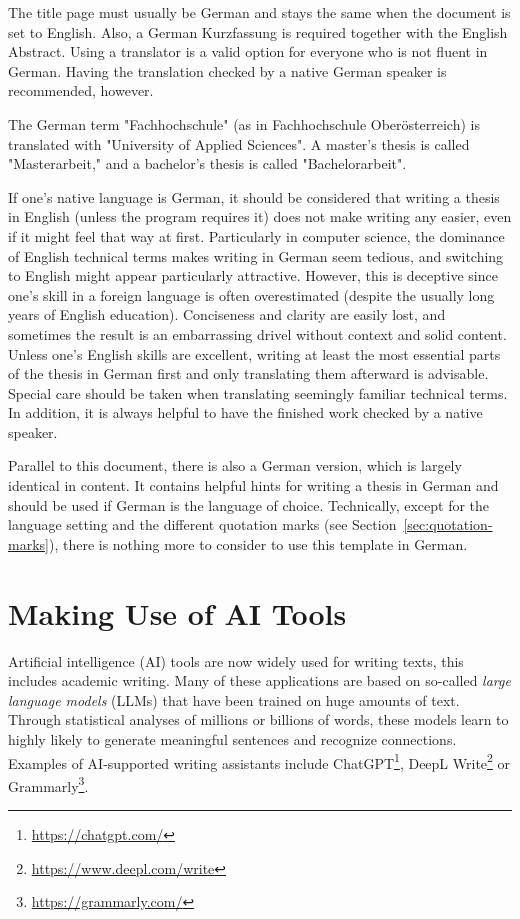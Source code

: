 The title page must usually be German and stays the same when the document is
set to English. Also, a German Kurzfassung is required together with the English
Abstract. Using a translator is a valid option for everyone who is not fluent
in German. Having the translation checked by a native German speaker is
recommended, however.

The German term "Fachhochschule" (as in Fachhochschule Oberösterreich) is
translated with "University of Applied Sciences". A master's thesis is called
"Masterarbeit," and a bachelor's thesis is called "Bachelorarbeit".

If one's native language is German, it should be considered that writing a
thesis in English (unless the program requires it) does not make writing any
easier, even if it might feel that way at first. Particularly in computer
science, the dominance of English technical terms makes writing in German seem
tedious, and switching to English might appear particularly attractive. However,
this is deceptive since one's skill in a foreign language is often overestimated
(despite the usually long years of English education). Conciseness and clarity
are easily lost, and sometimes the result is an embarrassing drivel without
context and solid content. Unless one's English skills are excellent, writing at
least the most essential parts of the thesis in German first and only
translating them afterward is advisable. Special care should be taken when
translating seemingly familiar technical terms. In addition, it is always
helpful to have the finished work checked by a native speaker.

Parallel to this document, there is also a German version, which is largely
identical in content. It contains helpful hints for writing a thesis in German
and should be used if German is the language of choice. Technically, except for
the language setting and the different quotation marks (see
Section~\ref{sec:quotation-marks}), there is nothing more to consider to use
this template in German.


\section{Making Use of AI Tools}

Artificial intelligence (AI) tools are now widely used for writing texts, this
includes academic writing. Many of these applications are based on so-called
\emph{large language models} (LLMs) that have been trained on huge amounts of text.
Through statistical analyses of millions or billions of words, these models
learn to highly likely to generate meaningful sentences and recognize
connections. Examples of AI-supported writing assistants include 
ChatGPT\footnote{\url{https://chatgpt.com/}},
DeepL Write\footnote{\url{https://www.deepl.com/write}} or 
Grammarly\footnote{\url{https://grammarly.com/}}.

